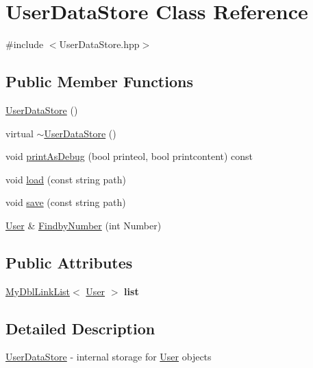 \hypertarget{classUserDataStore}{\section{User\-Data\-Store Class Reference}
\label{classUserDataStore}
}


{\ttfamily \#include $<$User\-Data\-Store.\-hpp$>$}

\subsection*{Public Member Functions}
\begin{DoxyCompactItemize}
\item 
\hyperlink{classUserDataStore_aa50dc180026a5c5cdcc11000b144501b}{User\-Data\-Store} ()
\item 
virtual \hyperlink{classUserDataStore_a25ec86d825cdb6a8e71a72f9364d6faf}{$\sim$\-User\-Data\-Store} ()
\item 
void \hyperlink{classUserDataStore_ac1b792f9cf3db12aa57338a8094eb885}{print\-As\-Debug} (bool printeol, bool printcontent) const 
\item 
void \hyperlink{classUserDataStore_a3803d4e9aac02522dc68277898d09287}{load} (const string path)
\item 
void \hyperlink{classUserDataStore_ac47e0d3fcf4419b41218a7eb88730995}{save} (const string path)
\item 
\hyperlink{classUser}{User} \& \hyperlink{classUserDataStore_a7c90eab199f035b1470c54e8cae6488e}{Findby\-Number} (int Number)
\end{DoxyCompactItemize}
\subsection*{Public Attributes}
\begin{DoxyCompactItemize}
\item 
\hypertarget{classUserDataStore_a2f05894d3008e7f1f4f1947cc0bdd96c}{\hyperlink{classnsMyDblLinkList_1_1MyDblLinkList}{My\-Dbl\-Link\-List}$<$ \hyperlink{classUser}{User} $>$ {\bfseries list}}\label{classUserDataStore_a2f05894d3008e7f1f4f1947cc0bdd96c}

\end{DoxyCompactItemize}


\subsection{Detailed Description}
\hyperlink{classUserDataStore}{User\-Data\-Store} -\/ internal storage for \hyperlink{classUser}{User} objects

